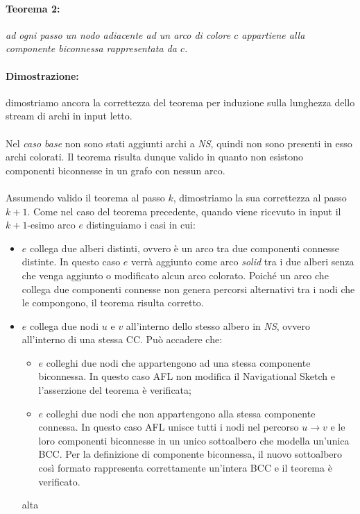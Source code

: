 \documentclass[a4paper,11pt]{report}
\begin{document}
\paragraph{Teorema 2:}\emph{ad ogni passo un nodo adiacente ad un arco di colore $c$ appartiene alla componente biconnessa rappresentata da
$c$.}
\paragraph{Dimostrazione:} dimostriamo ancora la correttezza del teorema per induzione sulla lunghezza dello stream di archi in input letto.
\paragraph{}
Nel \emph{caso base} non sono stati aggiunti archi a \emph{NS}, quindi non sono presenti in esso archi colorati. Il teorema risulta dunque
valido in quanto non esistono componenti
biconnesse in un grafo con nessun arco.
\paragraph{}
Assumendo valido il teorema al passo $k$, dimostriamo la sua correttezza al passo $k+1$.
Come nel caso del teorema precedente, quando viene ricevuto in input il $k+1$-esimo arco $e$ distinguiamo i casi in cui:
\begin{itemize}
 \item $e$ collega due alberi distinti, ovvero è un arco tra due componenti connesse distinte. In questo caso $e$ verrà aggiunto come arco
\emph{solid} tra i due alberi senza che venga aggiunto o modificato alcun arco colorato.
Poiché un arco che collega due componenti connesse non genera percorsi alternativi tra i nodi che le compongono, il teorema risulta
corretto.
 \item $e$ collega due nodi $u$ e $v$ all'interno dello stesso albero in \emph{NS}, ovvero all'interno di una stessa CC. Può accadere che:
 \begin{itemize}
  \item $e$ colleghi due nodi che appartengono ad una stessa componente biconnessa. In questo caso AFL non modifica il Navigational Sketch e
l'asserzione del teorema è verificata;
  \item $e$ colleghi due nodi che non appartengono alla stessa componente connessa. In questo caso AFL unisce tutti i nodi nel percorso $u
\rightarrow v$ e le loro componenti 
biconnesse in un unico sottoalbero che modella un'unica BCC. Per la definizione di componente biconnessa, il nuovo sottoalbero così formato
rappresenta correttamente 
un'intera BCC e il teorema è verificato.
 \end{itemize}alta 
\end{itemize}
\end{document}
